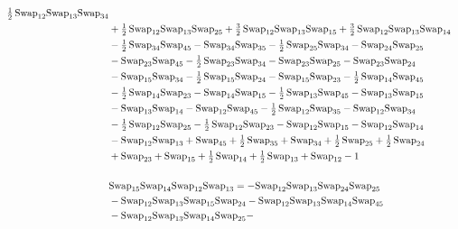 \documentclass[12pt,dvipsnames,accepted=2016-08-18,a4paper,onecolumn]{quantumarticle}
\numberwithin{equation}{section}
\theoremstyle{definition}
\begin{document}
\begin{align*}
        \tfrac12\,\textnormal{Swap}_{12} \textnormal{Swap}_{13} \textnormal{Swap}_{34}\\ & + \tfrac12\,\textnormal{Swap}_{12} \textnormal{Swap}_{13} \textnormal{Swap}_{25} + \tfrac32\,\textnormal{Swap}_{12} \textnormal{Swap}_{13} \textnormal{Swap}_{15} + \tfrac32\,\textnormal{Swap}_{12} \textnormal{Swap}_{13} \textnormal{Swap}_{14}\\ & -
        \tfrac12\,\textnormal{Swap}_{34} \textnormal{Swap}_{45} - \textnormal{Swap}_{34} \textnormal{Swap}_{35} - \tfrac12\,\textnormal{Swap}_{25} \textnormal{Swap}_{34} - \textnormal{Swap}_{24} \textnormal{Swap}_{25}\\ & - \textnormal{Swap}_{23} \textnormal{Swap}_{45} - \tfrac12\,\textnormal{Swap}_{23} \textnormal{Swap}_{34} -
        \textnormal{Swap}_{23} \textnormal{Swap}_{25} - \textnormal{Swap}_{23} \textnormal{Swap}_{24}\\ & - \textnormal{Swap}_{15} \textnormal{Swap}_{34} - \tfrac12\,\textnormal{Swap}_{15} \textnormal{Swap}_{24} - \textnormal{Swap}_{15} \textnormal{Swap}_{23} - \tfrac12\,\textnormal{Swap}_{14} \textnormal{Swap}_{45}\\ & -
        \tfrac12\,\textnormal{Swap}_{14} \textnormal{Swap}_{23} - \textnormal{Swap}_{14} \textnormal{Swap}_{15} - \tfrac12\,\textnormal{Swap}_{13} \textnormal{Swap}_{45} - \textnormal{Swap}_{13} \textnormal{Swap}_{15}\\ & - \textnormal{Swap}_{13} \textnormal{Swap}_{14} - \textnormal{Swap}_{12} \textnormal{Swap}_{45} -
        \tfrac12\,\textnormal{Swap}_{12} \textnormal{Swap}_{35} - \textnormal{Swap}_{12} \textnormal{Swap}_{34}\\ & - \tfrac12\,\textnormal{Swap}_{12} \textnormal{Swap}_{25} - \tfrac12\,\textnormal{Swap}_{12} \textnormal{Swap}_{23} - \textnormal{Swap}_{12} \textnormal{Swap}_{15} - \textnormal{Swap}_{12} \textnormal{Swap}_{14}\\ & -
        \textnormal{Swap}_{12} \textnormal{Swap}_{13} + \textnormal{Swap}_{45} + \tfrac12\,\textnormal{Swap}_{35} + \textnormal{Swap}_{34} + \tfrac12\,\textnormal{Swap}_{25} + \tfrac12\,\textnormal{Swap}_{24}\\ & + \textnormal{Swap}_{23} + \textnormal{Swap}_{15} + \tfrac12\,\textnormal{Swap}_{14}
        + \tfrac12\,\textnormal{Swap}_{13} + \textnormal{Swap}_{12} - 1\\
        \\
        &\textnormal{Swap}_{15}   \textnormal{Swap}_{14}   \textnormal{Swap}_{12}   \textnormal{Swap}_{13} = -\textnormal{Swap}_{12} \textnormal{Swap}_{13} \textnormal{Swap}_{24} \textnormal{Swap}_{25}\\ & - \textnormal{Swap}_{12} \textnormal{Swap}_{13} \textnormal{Swap}_{15} \textnormal{Swap}_{24} - \textnormal{Swap}_{12} \textnormal{Swap}_{13} \textnormal{Swap}_{14} \textnormal{Swap}_{45}\\ & - \textnormal{Swap}_{12} \textnormal{Swap}_{13} \textnormal{Swap}_{14} \textnormal{Swap}_{25} -

\end{align*}
\end{document}
